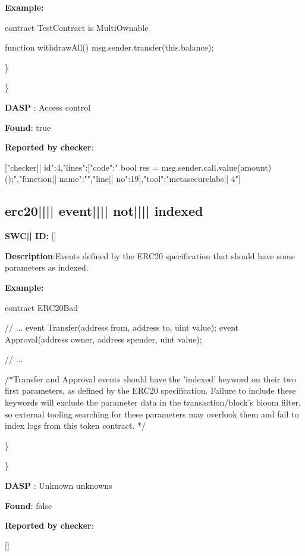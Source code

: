 \documentclass{article}
\begin{document}
\textbf{Example:} 
\begin{ffcode} 

contract TestContract is MultiOwnable {

  function withdrawAll(){
    msg.sender.transfer(this.balance);
  }
}

\end{ffcode} 
\} 

\} 

\textbf{DASP} : Access control

\textbf{Found}: true

\textbf{Reported by checker}: 
\begin{ffcode} 

[{"checker|\textunderscore| id":4,"lines":[{"code":"      bool res = msg.sender.call.value(amount)();\n","function|\textunderscore| name":"","line|\textunderscore| no":19}],"tool":"metasecurelabs|\textendash| 4"}]
\end{ffcode} 
\subsection{erc20{||\textunderscore|| }event{||\textunderscore|| }not{||\textunderscore|| }indexed} 
\textbf{SWC{|\textunderscore| }ID:} []

\textbf{Description}:Events defined by the ERC20 specification that should have some parameters as indexed.


\textbf{Example:} 
\begin{ffcode} 

contract ERC20Bad {
    // ...
    event Transfer(address from, address to, uint value);
    event Approval(address owner, address spender, uint value);

    // ...
}

 /*Transfer and Approval events should have the 'indexed' keyword on their two first parameters, as defined by the ERC20 specification. Failure to include these keywords will exclude the parameter data in the transaction/block's bloom filter, so external tooling searching for these parameters may overlook them and fail to index logs from this token contract. */ 

\end{ffcode} 
\} 

\} 

\textbf{DASP} : Unknown unknowns

\textbf{Found}: false

\textbf{Reported by checker}: 
\begin{ffcode} 

[]
\end{ffcode} 
\end{document}

